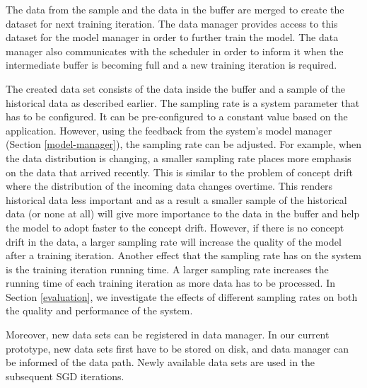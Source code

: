 The data from the sample and the data in the buffer are merged to create the dataset for next training iteration.
The data manager provides access to this dataset for the model manager in order to further train the model.
The data manager also communicates with the scheduler in order to inform it when the intermediate buffer is becoming full and a new training iteration is required. 

The created data set consists of the data inside the buffer and a sample of the historical data as described earlier.
The sampling rate is a system parameter that has to be configured.
It can be pre-configured to a constant value based on the application.
However, using the feedback from the system's model manager (Section \ref{model-manager}), the sampling rate can be adjusted.
For example, when the data distribution is changing, a smaller sampling rate places more emphasis on the data that arrived recently. 
This is similar to the problem of concept drift where the distribution of the incoming data changes overtime.
This renders historical data less important and as a result a smaller sample of the historical data (or none at all) will give more importance to the data in the buffer and help the model to adopt faster to the concept drift.
However, if there is no concept drift in the data, a larger sampling rate will increase the quality of the model after a training iteration.
Another effect that the sampling rate has on the system is the training iteration running time.
A larger sampling rate increases the running time of each training iteration as more data has to be processed.
In Section \ref{evaluation}, we investigate the effects of different sampling rates on both the quality and performance of the system.

Moreover,  new data sets can be registered in data manager.
In our current prototype, new data sets first have to be stored on disk, and data manager can be informed of the data path.
Newly available data sets are used in the subsequent SGD iterations.

